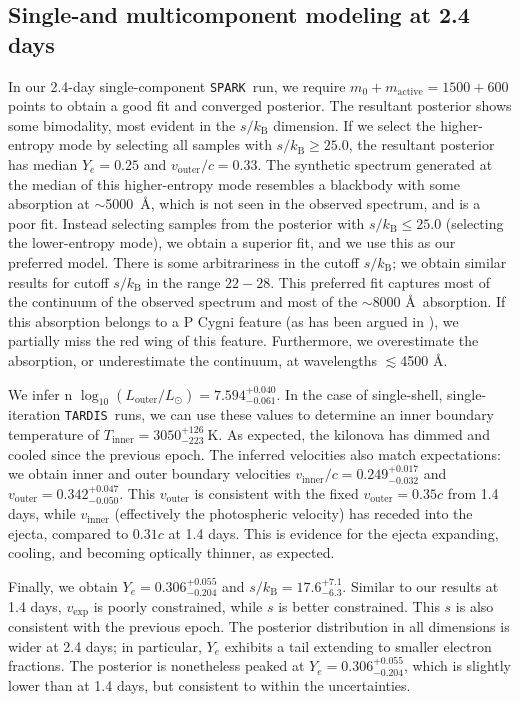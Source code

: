 \documentclass[twocolumn,twocolappendix]{aastex63}
\def\SPARK{\texttt{SPARK}}
\def\TARDIS{\texttt{TARDIS}}
\begin{document}
{{{{{{%
\subsection{Single-and multicomponent modeling at 2.4 days}\label{ssc:2.4}

In our 2.4-day single-component \SPARK~run, we require $m_0 + m_{\mathrm{active}} = 1500 + 600$ points to obtain a good fit and converged posterior. The resultant posterior shows some bimodality, most evident in the $s/k_{\mathrm{B}}$ dimension. If we select the higher-entropy mode by selecting all samples with $s/k_{\mathrm{B}} \geqslant 25.0$, the resultant posterior has median $Y_e = 0.25$ and $v_{\mathrm{outer}}/c = 0.33$. The synthetic spectrum generated at the median of this higher-entropy mode resembles a blackbody with some absorption at $\sim$5000~\AA, which is not seen in the observed spectrum, and is a poor fit. Instead selecting samples from the posterior with $s/k_{\mathrm{B}} \leqslant 25.0$ (selecting the lower-entropy mode), we obtain a superior fit, and we use this as our preferred model. There is some arbitrariness in the cutoff $s/k_{\mathrm{B}}$; we obtain similar results for cutoff $s/k_{\mathrm{B}}$ in the range $22-28$. This preferred fit captures most of the continuum of the observed spectrum and most of the $\sim$8000 \AA~absorption. If this absorption belongs to a P Cygni feature (as has been argued in \citealt{watson19, sneppen23}), we partially miss the red wing of this feature. Furthermore, we overestimate the absorption, or underestimate the continuum, at wavelengths $\lesssim$4500 \AA. 

We infer n $\log_{10} (L_{\mathrm{outer}}/L_{\odot}) = 7.594^{+0.040}_{-0.061}$. In the case of single-shell, single-iteration \TARDIS~runs, we can use these values to determine an inner boundary temperature of $T_{\mathrm{inner}} = 3050^{+126}_{-223}~\mathrm{K}$. As expected, the kilonova has dimmed and cooled since the previous epoch. The inferred velocities also match expectations: we obtain inner and outer boundary velocities $v_{\mathrm{inner}}/c = 0.249^{+0.017}_{-0.032}$ and $v_{\mathrm{outer}} = 0.342^{+0.047}_{-0.050}$. This $v_{\mathrm{outer}}$ is consistent with the fixed $v_{\mathrm{outer}} = 0.35c$ from 1.4 days, while $v_{\mathrm{inner}}$ (effectively the photospheric velocity) has receded into the ejecta, compared to $0.31c$ at 1.4 days. This is evidence for the ejecta expanding, cooling, and becoming optically thinner, as expected.

Finally, we obtain $Y_e = 0.306^{+0.055}_{-0.204}$ and $s/k_{\mathrm{B}} = 17.6^{+7.1}_{-6.3}$. Similar to our results at 1.4 days, $v_{\mathrm{exp}}$ is poorly constrained, while $s$ is better constrained. This $s$ is also consistent with the previous epoch. The posterior distribution in all dimensions is wider at 2.4 days; in particular, $Y_e$ exhibits a tail extending to smaller electron fractions. The posterior is nonetheless peaked at $Y_e = 0.306^{+0.055}_{-0.204}$, which is slightly lower than at 1.4 days, but consistent to within the uncertainties. 

}}}}}}
\end{document}
